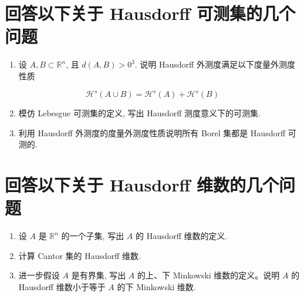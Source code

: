 \documentclass[hyperref,a4paper,UTF8]{ctexart}
\begin{document}
\section*{回答以下关于 Hausdorff 可测集的几个问题}
\begin{enumerate}
  \item 设 $A, B \subset \mathbb{R}^{n}$, 且 $d(A, B)>0^{3}$. 说明 Hausdorff 外测度满足以下度量外测度性质
\end{enumerate}

$$
\mathcal{H}^{s}(A \cup B)=\mathcal{H}^{s}(A)+\mathcal{H}^{s}(B)
$$

\begin{enumerate}
  \setcounter{enumi}{1}
  \item 模仿 Lebesgue 可测集的定义, 写出 Hausdorff 测度意义下的可测集.

  \item 利用 Hausdorff 外测度的度量外测度性质说明所有 Borel 集都是 Hausdorff 可测的.

\end{enumerate}

\section*{回答以下关于 Hausdorff 维数的几个问题}
\begin{enumerate}
  \item 设 $A$ 是 $\mathbb{R}^{n}$ 的一个子集, 写出 $A$ 的 Hausdorff 维数的定义.

  \item 计算 Cantor 集的 Hausdorff 维数.

  \item 进一步假设 $A$ 是有界集, 写出 $A$ 的上、下 Minkowski 维数的定义。说明 $A$ 的 Hausdorff 维数小于等于 $A$ 的下 Minkowski 维数.

\end{enumerate}
\end{document}

